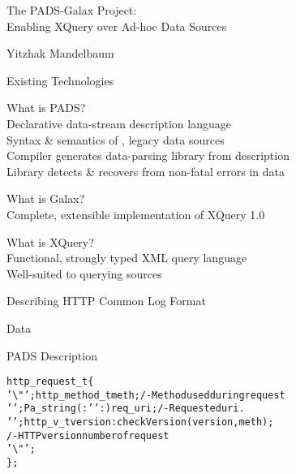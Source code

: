 \documentclass[landscape]{slides}
\begin{document}

\begin{slide}
\begin{center}\LARGE\color{blue}
The PADS-Galax Project: \\
Enabling XQuery over  Ad-hoc Data Sources

Yitzhak Mandelbaum
\end{center}
\end{slide}

\begin{Slide}{Existing Technologies}
  
  \vspace*{1cm}
  \bb What is PADS?\\
  \bbb Declarative data-stream description language\\
  \bbb Syntax \& semantics of , legacy data sources \\
  \bbb Compiler generates data-parsing library from description\\
  \bbb Library detects \& recovers from non-fatal errors in data

  \bb What is Galax?\\
  \bbb Complete, extensible implementation of XQuery 1.0 

  \bb What is XQuery?\\
  \bbb Functional, strongly typed XML query language \\
  \bbb Well-suited to querying  sources

\end{Slide}

\begin{Slide}{Describing HTTP Common Log Format}

  \bb Data

{\small
\begin{alltt}
\end{alltt}
}
  \bb PADS Description

{\small
\begin{alltt}
 http_request_t \{
  '\verb|\"|'; http_method_t    meth;           /- Method used during request
  ' ';  Pa_string(:' ':) req_uri;        /- Requested uri.
  ' ';  http_v_t         version : checkVersion(version, meth);
                                         /- HTTP version number of request 
  '\verb|\"|';
\};
\end{alltt}
}

\end{Slide}
\end{document}
